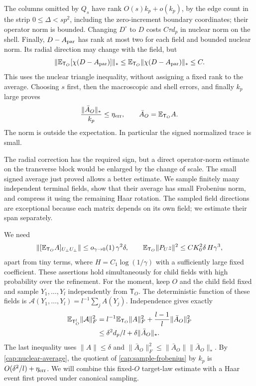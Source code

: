 The columns omitted by \(Q_s\) have rank \(O(s)k_p+o(k_p)\), by the edge
count in the strip \(0\le\Delta<sp^2\), including the zero-increment
boundary coordinates; their operator norm is bounded.
Changing \(D^\circ\) to \(D\) costs \(C\tau d_p\) in nuclear norm on the
shell. Finally, \(D-A_{\rm par}\) has rank at most two for each field and bounded
nuclear norm. Its radial direction may change with the field, but
\[
 \|\mathbb E_{\mathsf T_O}[\chi(D-A_{\rm par})]\|_*
 \le\mathbb E_{\mathsf T_O}\|\chi(D-A_{\rm par})\|_*\le C.
\]
This uses the nuclear triangle inequality, without assigning a fixed rank
to the average. Choosing \(s\) first, then the macroscopic and shell errors,
and finally \(k_p\) large proves
\begin{equation}\label{cap:nuclear-average}
 \frac{\|\bar A_O\|_*}{k_p}\le\eta_{\rm err},
 \qquad \bar A_O=\mathbb E_{\mathsf T_O}A .
\end{equation}
The norm is outside the expectation. In particular the signed normalized
trace is small.

The radial correction has the required sign, but a direct operator-norm
estimate on the transverse block would be enlarged by the change of scale. The
small signed average just proved allows a better estimate. We sample finitely
many independent terminal fields, show that their average has small Frobenius
norm, and compress it using the remaining Haar rotation. The sampled field
directions are exceptional because each matrix depends on its own field; we
estimate their span separately.

We need
\begin{equation}
 \|[\mathbb E_{\mathsf T_O}A]_{U_\perp U_\perp}\|
 \le o_{\gamma\to0}(1)\,\gamma^2\delta,\qquad
 \mathbb E_{\mathsf T_O}\|P_U z\|^2\le C K_0^2\delta\, H\gamma^3 ,
 \label{cap:compression}
\end{equation}
apart from tiny terms, where \(H=C_1\log(1/\gamma)\) with a sufficiently large
fixed coefficient. These assertions hold simultaneously for child fields with
high probability over the refinement. For the moment, keep \(O\) and the child
field fixed and sample \(Y_1,\ldots,Y_l\) independently from \(\mathsf T_O\).
The deterministic function of these fields is
\(\mathcal A(Y_1,\ldots,Y_l)=l^{-1}\sum_jA(Y_j)\). Independence gives exactly
\begin{align}\label{cap:sample-frobenius}
 \mathbb E_{\mathsf T_O^l}\|\mathcal A\|_F^2
 &=l^{-1}\mathbb E_{\mathsf T_O}\|A\|_F^2
   +\frac{l-1}{l}\|\bar A_O\|_F^2\nonumber\\
 &\le \delta^2d_p/l+\delta\|\bar A_O\|_* .
\end{align}
The last inequality uses \(\|A\|\le\delta\) and
\(\|\bar A_O\|_F^2\le\|\bar A_O\|\|\bar A_O\|_*\).
By \eqref{cap:nuclear-average}, the quotient of
\eqref{cap:sample-frobenius} by \(k_p\) is
\(O(\delta^2/l)+\eta_{\rm err}\). We will combine this fixed-\(O\) target-law
estimate with a Haar event first proved under canonical sampling.

